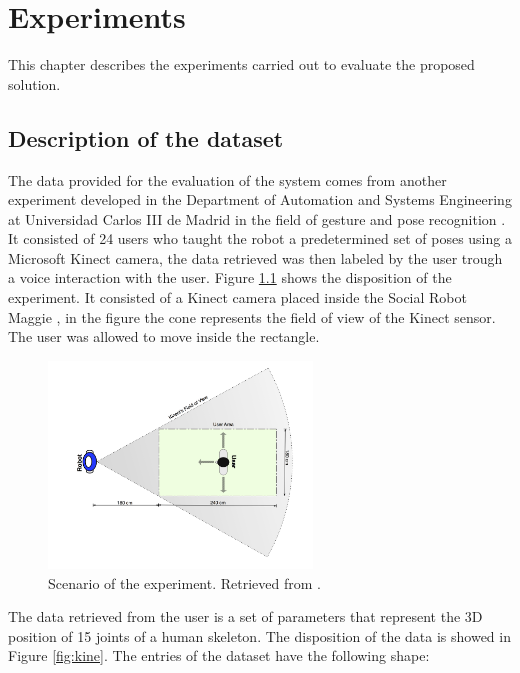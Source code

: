 
\chapter{Experiments} %

\label{Chapter4} %


This chapter describes the experiments carried out to evaluate the proposed solution. 
 
\section{Description of the dataset} \label{4.1}

The data provided for the evaluation of the system comes from another experiment developed in the Department of Automation and Systems Engineering at Universidad Carlos III de Madrid in the field of gesture and pose recognition \cite{Gonzalez-Pacheco2013}. It consisted of 24 users who taught the robot a predetermined set of poses using a Microsoft Kinect camera, the data retrieved was then labeled by the user trough a voice interaction with the user. Figure \ref{fig:scen} shows the disposition of the experiment. It consisted of a Kinect camera placed inside the Social Robot Maggie \cite{maggie}, in the figure the cone represents the field of view of the Kinect sensor. The user was allowed to move inside the rectangle.

\begin{figure}[h]
\includegraphics[width=7cm]{Figures/Scenario}
\centering
\caption{Scenario of the experiment. Retrieved from \cite{Gonzalez-Pacheco2013}. \label{fig:scen}}
\end{figure}

The data retrieved from the user is a set of parameters that represent the 3D position of 15 joints of a human skeleton. The disposition of the data is showed in Figure \ref{fig:kine}. The entries of the dataset have the following shape:

